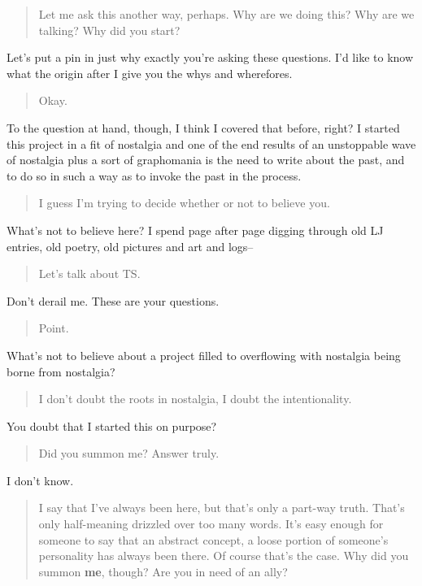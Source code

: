 \begin{quote}
Let me ask this another way, perhaps. Why are we doing this? Why are we talking? Why did you start?
\end{quote}

Let's put a pin in just why exactly you're asking these questions. I'd like to know what the origin after I give you the whys and wherefores.

\begin{quote}
Okay.
\end{quote}

To the question at hand, though, I think I covered that before, right? I started this project in a fit of nostalgia and one of the end results of an unstoppable wave of nostalgia plus a sort of graphomania is the need to write about the past, and to do so in such a way as to invoke the past in the process.

\begin{quote}
I guess I'm trying to decide whether or not to believe you.
\end{quote}

What's not to believe here? I spend page after page digging through old LJ entries, old poetry, old pictures and art and logs--

\begin{quote}
Let's talk about TS.
\end{quote}

Don't derail me. These are your questions.

\begin{quote}
Point.
\end{quote}

What's not to believe about a project filled to overflowing with nostalgia being borne from nostalgia?

\begin{quote}
I don't doubt the roots in nostalgia, I doubt the intentionality.
\end{quote}

You doubt that I started this on purpose?

\begin{quote}
Did you summon me? Answer truly.
\end{quote}

I don't know.

\begin{quote}
I say that I've always been here, but that's only a part-way truth. That's only half-meaning drizzled over too many words. It's easy enough for someone to say that an abstract concept, a loose portion of someone's personality has always been there. Of course that's the case. Why did you summon \textbf{me}, though? Are you in need of an ally?
\end{quote}

